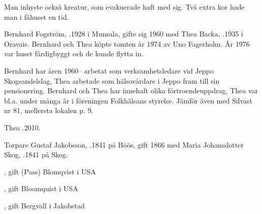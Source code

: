 Man inhyste också kreatur, som evakuerade haft med sig. Två extra kor hade man i fähuset en tid.



%



%
Bernhard Fogström, .1928 i Munsala, gifte sig 1960 med Thea Backa, .1935 i Oravais. Bernhard och Thea köpte tomten år 1974 av Uno Fagerholm. År 1976 var huset färdigbyggt och de kunde flytta in.
\begin{jhchildren}
  \item {}
  \item {}
  \item {}
\end{jhchildren}

Bernhard har åren 1960-- arbetat som verksamhetsledare vid Jeppo Skogsandelslag, Thea arbetade som hälsovårdare i Jeppo fram	till sin pensionering. Bernhard och Thea har innehaft olika förtroendeuppdrag, Thea var bl.a. under många år i föreningen Folkhälsans styrelse. Jämför även med Silvast nr 81, mellersta lokalen p. 9.

Thea .2010.



%


%
Torpare Gustaf Jakobsson, .1841 på Böös, gift 1866 med Maria Johansdotter Skog, .1841 på Skog.
\begin{jhchildren}
  \item {}
  \item {}, gift (Pass) Blomqvist i USA
  \item {}
  \item {}
  \item {}, gift Bloomquist i USA
  \item {}
  \item {}
  \item {}, gift Bergvall i Jakobstad
\end{jhchildren}

